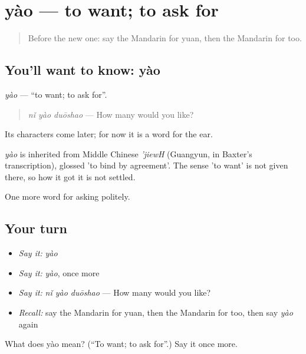 \section[yào]{yào — to want; to ask for}

\label{lesson:ZH-C41-yao}



\begin{quote}
Before the new one: say the Mandarin for yuan, then the Mandarin for too.
\end{quote}

\subsection*{You'll want to know: yào}
\emph{yào} — \textquotedblleft{}to want; to ask for\textquotedblright{}.

\begin{quote}
\emph{nǐ yào duōshao} — How many would you like?
\end{quote}

Its characters come later; for now it is a word for the ear.

\begin{cousinweb}
\emph{yào} is inherited from Middle Chinese \emph{'jiewH} (Guangyun, in Baxter's transcription), glossed 'to bind by agreement'. The sense 'to want' is not given there, so how it got it is not settled.
\end{cousinweb}

\begin{grammarlens}[title={What you've built}]
One more word for asking politely.
\end{grammarlens}

\subsection*{Your turn}
\begin{itemize}
\raggedright
  \item \emph{Say it:} \emph{yào}
  \item \emph{Say it:} \emph{yào}, once more
  \item \emph{Say it:} \emph{nǐ yào duōshao} — How many would you like?
  \item \emph{Recall:} say the Mandarin for yuan, then the Mandarin for too, then say \emph{yào} again
\end{itemize}

\begin{tcolorbox}[breakable,colback=teal!4,colframe=teal!35!black,title={Before you move on}]
What does yào mean? (\textquotedblleft{}To want; to ask for\textquotedblright{}.) Say it once more.
\end{tcolorbox}
